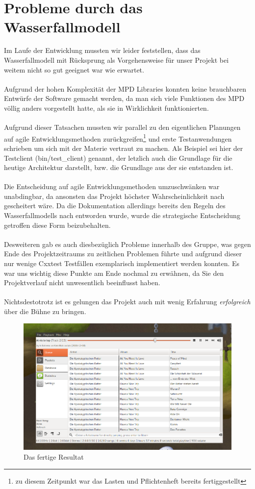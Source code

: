 \documentclass[11pt]{scrreprt}
\begin{document}
\section{Probleme durch das Wasserfallmodell}
Im Laufe der Entwicklung mussten wir leider feststellen, dass das Wasserfallmodell mit Rücksprung als Vorgehensweise für unser Projekt bei weitem nicht so gut geeignet war wie erwartet.
\\
\\
Aufgrund der hohen Komplexität der MPD Libraries konnten keine brauchbaren Entwürfe der 
Software gemacht werden, da man sich viele Funktionen des MPD völlig anders vorgestellt hatte, als sie in 
Wirklichkeit funktionierten. 
\\
\\
Aufgrund dieser Tatsachen mussten wir parallel zu den eigentlichen Planungen auf agile Entwicklungsmethoden zurückgreifen\footnote{zu diesem Zeitpunkt war das Lasten und Pflichtenheft bereits fertiggestellt} und erste Testanwendungen schrieben um sich mit der Materie vertraut zu machen.
Als Beispiel sei hier der Testclient (bin/test\_client) genannt, der letzlich auch die Grundlage für die heutige
Architektur darstellt, bzw. die Grundlage aus der sie entstanden ist.
\\
\\
Die Entscheidung auf agile Entwicklungsmethoden umzuschwänken war unabdingbar, da ansonsten das Projekt 
höchster Wahrscheinlichkeit nach gescheitert wäre. Da die Dokumentation allerdings bereits den Regeln des Wasserfallmodells nach entworden wurde,
wurde die strategische Entscheidung getroffen diese Form beizubehalten.
\\
\\
Desweiteren gab es auch diesbezüglich Probleme innerhalb des Gruppe, was gegen Ende des Projektzeitraums
zu zeitlichen Problemen führte und aufgrund dieser nur wenige Cxxtest Testfällen exemplarisch implementiert werden konnten.
Es war uns wichtig diese Punkte am Ende nochmal zu erwähnen, da Sie den Projektverlauf nicht unwesentlich beeinflusst haben.
\\
\\
Nichtsdestotrotz ist es gelungen das Projekt auch mit wenig Erfahrung \emph{erfolgreich} über die Bühne zu bringen. 
\begin{figure}[htb!]
    \centering
    \includegraphics[scale=0.5]{final_result.png}
    \caption{Das fertige Resultat}
    \label{pic_final_result}
\end{figure}
\end{document}
